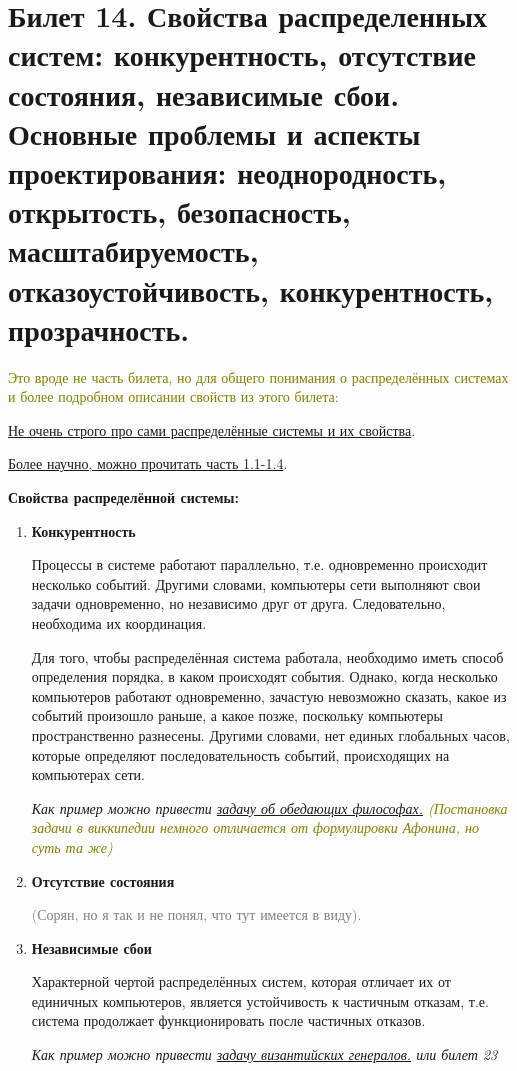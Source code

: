 \newpage
\section{Билет 14. Свойства распределенных систем: конкурентность, отсутствие состояния, независимые сбои. Основные проблемы и аспекты проектирования: неоднородность, открытость, безопасность, масштабируемость, отказоустойчивость, конкурентность, прозрачность.}

\textcolor{olive}{Это вроде не часть билета, но для общего понимания о распределённых системах и более подробном описании свойств из этого билета:}

\textcolor{blue}{\href{https://novator.io/innovatsii/mir-raspredelyonnyh-sistem-ego-zakony-i-magiya-konsensusa-nakamoto}{Не очень строго про сами распределённые системы и их свойства}.}

\textcolor{blue}{\href{https://books.ifmo.ru/file/pdf/1551.pdf}{Более научно, можно прочитать часть 1.1-1.4}.}

\textbf{ Свойства распределённой системы:}
\begin{enumerate}
\item \textbf{Конкурентность}

Процессы в системе работают параллельно, т.е. одновременно происходит несколько событий. Другими словами, компьютеры сети выполняют свои задачи одновременно, но независимо друг от друга. Следовательно, необходима их координация.

Для того, чтобы распределённая система работала, необходимо иметь способ определения порядка, в каком происходят события. Однако, когда несколько компьютеров работают одновременно, зачастую невозможно сказать, какое из событий произошло раньше, а какое позже, поскольку компьютеры пространственно разнесены. Другими словами, нет единых глобальных часов, которые определяют последовательность событий, происходящих на компьютерах сети.

\textit{Как пример можно привести \textcolor{blue}{\href{https://clck.ru/puqyK}{ задачу об обедающих философах.}} \textcolor{olive}{(Постановка задачи в виккипедии немного отличается от формулировки Афонина, но суть та же)}}

\item \textbf{ Отсутствие состояния}

\textcolor{gray}{(Сорян, но я так и не понял, что тут имеется в виду).}

\item \textbf{ Независимые сбои}

Характерной чертой распределённых систем, которая отличает их от единичных компьютеров, является устойчивость к частичным отказам, т.е. система продолжает функционировать после частичных отказов.

\textit{Как пример можно привести \textcolor{blue}{\href{https://clck.ru/JVS7z}{задачу византийских генералов.}} или билет 23}
\end{enumerate}


